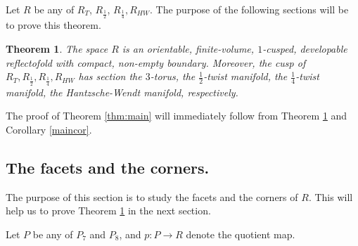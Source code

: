 \documentclass{amsart}
\newtheorem{thm}[lemma]{Theorem}
\theoremstyle{definition}
\theoremstyle{remark}
\begin{document}
Let $R$ be any of $R_T$, $R_{\frac{1}{2}}$, $R_{\frac{1}{4}}, R_{HW}$. The purpose of the following sections will be to prove this theorem.

\begin{thm}
\label{Rbello}
    The space $R$ is an orientable, finite-volume, $1$-cusped, developable reflectofold with compact, non-empty boundary. Moreover, the cusp of $R_T, R_{\frac{1}{2}},R_{\frac{1}{4}}, R_{HW}$ has section the $3$-torus, the $\frac{1}{2}$-twist manifold, the $\frac{1}{4}$-twist manifold, the Hantzsche-Wendt manifold, respectively.
\end{thm}

The proof of Theorem \ref{thm:main} will immediately follow from Theorem \ref{Rbello} and Corollary \ref{maincor}.

\subsection{The facets and the corners.}\label{ref2}
The purpose of this section is to study the facets and the corners of $R$. This will help us to prove Theorem \ref{Rbello} in the next section.



Let $P$ be any of $P_7$ and $P_8$, and $p\colon P\rightarrow R$ denote the quotient map.
\end{document}

